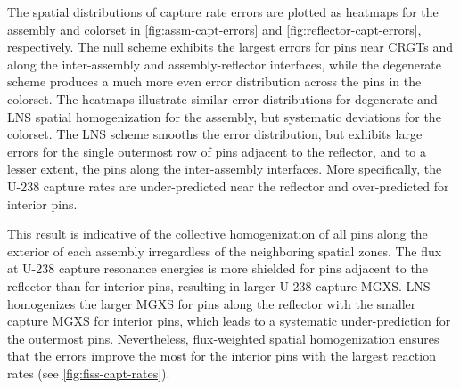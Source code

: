The spatial distributions of capture rate errors are plotted as heatmaps for the assembly and colorset in \autoref{fig:assm-capt-errors} and \autoref{fig:reflector-capt-errors}, respectively. The null scheme exhibits the largest errors for pins near CRGTs and along the inter-assembly and assembly-reflector interfaces, while the degenerate scheme produces a much more even error distribution across the pins in the colorset. The heatmaps illustrate similar error distributions for degenerate and LNS spatial homogenization for the assembly, but systematic deviations for the colorset. The LNS scheme smooths the error distribution, but exhibits large errors for the single outermost row of pins adjacent to the reflector, and to a lesser extent, the pins along the inter-assembly interfaces. More specifically, the U-238 capture rates are under-predicted near the reflector and over-predicted for interior pins.

This result is indicative of the collective homogenization of all pins along the exterior of each assembly irregardless of the neighboring spatial zones. The flux at U-238 capture resonance energies is more shielded for pins adjacent to the reflector than for interior pins, resulting in larger U-238 capture MGXS. LNS homogenizes the larger MGXS for pins along the reflector with the smaller capture MGXS for interior pins, which leads to a systematic under-prediction for the outermost pins. Nevertheless, flux-weighted spatial homogenization ensures that the errors improve the most for the interior pins with the largest reaction rates (see \autoref{fig:fiss-capt-rates}).

\clearpage

